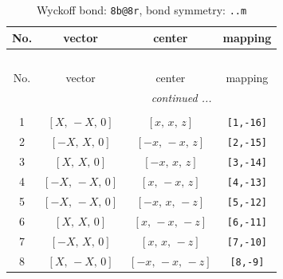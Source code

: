 \documentclass[fleqn,8pt]{jsarticle}
\begin{document}
\begin{longtable}{cccc}
\caption{Wyckoff bond: {\tt 8b@8r}, bond symmetry: {\tt ..m}}
 \\
 \hline \hline
No. & vector & center & mapping \\ \hline \endfirsthead

\multicolumn{3}{l}{\tablename\ \thetable{}} \\
 \hline \hline
No. & vector & center & mapping \\ \hline \endhead

 \hline \hline
\multicolumn{3}{r}{\footnotesize\it continued ...} \\ \endfoot

 \hline \hline
\multicolumn{3}{r}{} \\ \endlastfoot

1 & $\left[ X,\, - X,\, 0 \right]$ & $\left[ x,\, x,\, z \right]$ & {\tt [1,-16]} \\ \hline
2 & $\left[ - X,\, X,\, 0 \right]$ & $\left[ - x,\, - x,\, z \right]$ & {\tt [2,-15]} \\ \hline
3 & $\left[ X,\, X,\, 0 \right]$ & $\left[ - x,\, x,\, z \right]$ & {\tt [3,-14]} \\ \hline
4 & $\left[ - X,\, - X,\, 0 \right]$ & $\left[ x,\, - x,\, z \right]$ & {\tt [4,-13]} \\ \hline
5 & $\left[ - X,\, - X,\, 0 \right]$ & $\left[ - x,\, x,\, - z \right]$ & {\tt [5,-12]} \\ \hline
6 & $\left[ X,\, X,\, 0 \right]$ & $\left[ x,\, - x,\, - z \right]$ & {\tt [6,-11]} \\ \hline
7 & $\left[ - X,\, X,\, 0 \right]$ & $\left[ x,\, x,\, - z \right]$ & {\tt [7,-10]} \\ \hline
8 & $\left[ X,\, - X,\, 0 \right]$ & $\left[ - x,\, - x,\, - z \right]$ & {\tt [8,-9]} \\
\end{longtable}
\renewcommand{\arraystretch}{1.2}
\end{document}
